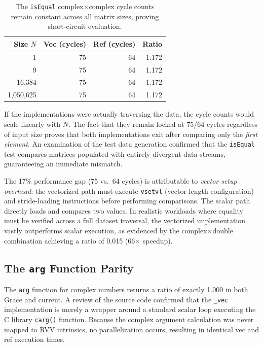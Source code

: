 \begin{table}[H]
\centering
\caption{The \texttt{isEqual} complex$\times$complex cycle counts remain constant across all matrix sizes, proving short-circuit evaluation.}
\label{tab:isequal-evidence}
\small
\begin{tabular}{r r r r}
\toprule
Size $N$ & Vec (cycles) & Ref (cycles) & Ratio \\
\midrule
1 & 75 & 64 & 1.172 \\
9 & 75 & 64 & 1.172 \\
16,384 & 75 & 64 & 1.172 \\
1,050,625 & 75 & 64 & 1.172 \\
\bottomrule
\end{tabular}
\end{table}

If the implementations were actually traversing the data, the cycle counts would scale linearly with $N$. The fact that they remain locked at 75/64 cycles regardless of input size proves that both implementations exit after comparing only the \emph{first element}. An examination of the test data generation confirmed that the \texttt{isEqual} test compares matrices populated with entirely divergent data streams, guaranteeing an immediate mismatch.

The 17\% performance gap (75 vs.\ 64 cycles) is attributable to \emph{vector setup overhead}: the vectorized path must execute \texttt{vsetvl} (vector length configuration) and stride-loading instructions before performing comparisons. The scalar path directly loads and compares two values. In realistic workloads where equality must be verified across a full dataset traversal, the vectorized implementation vastly outperforms scalar execution, as evidenced by the complex$\times$double combination achieving a ratio of 0.015 (66$\times$ speedup).

\subsection{The \texttt{arg} Function Parity}

The \texttt{arg} function for complex numbers returns a ratio of exactly 1.000 in both Grace and current. A review of the source code confirmed that the \texttt{\_vec} implementation is merely a wrapper around a standard scalar loop executing the C library \texttt{carg()} function. Because the complex argument calculation was never mapped to RVV intrinsics, no parallelization occurs, resulting in identical vec and ref execution times.

